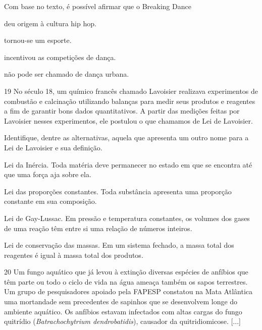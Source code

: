 Com base no texto, é possível afirmar que o Breaking Dance

\begin{escolha}
\item deu origem à cultura hip hop.

\item tornou-se um esporte.

\item incentivou as competições de dança.

\item não pode ser chamado de dança urbana.
\end{escolha}

\pagebreak
\num{19}
  No século 18, um químico francês chamado Lavoisier realizava experimentos de combustão e calcinação utilizando balanças para medir
  seus produtos e reagentes a fim de garantir bons dados quantitativos. A
  partir das medições feitas por Lavoisier nesses experimentos, ele
  postulou o que chamamos de Lei de Lavoisier.


Identifique, dentre as alternativas, aquela que apresenta um outro nome para a Lei de Lavoisier e sua definição.

\begin{escolha}
\item
  Lei da Inércia. Toda matéria deve permanecer no estado em que se
  encontra até que uma força aja sobre ela.
\item
  Lei das proporções constantes. Toda substância apresenta uma proporção
  constante em sua composição.
\item
  Lei de Gay-Lussac. Em pressão e temperatura constantes, os volumes dos
  gases de uma reação têm entre si uma relação de números inteiros.
\item
  Lei de conservação das massas. Em um sistema fechado, a massa total dos
  reagentes é igual à massa total dos produtos.
\end{escolha}

\num{20}
  Um fungo aquático que já levou à extinção diversas espécies de
  anfíbios que têm parte ou todo o ciclo de vida na água ameaça também
  os sapos terrestres. Um grupo de pesquisadores apoiado pela FAPESP
  constatou na Mata Atlântica uma mortandade sem precedentes de sapinhos
  que se desenvolvem longe do ambiente aquático. Os anfíbios estavam
  infectados com altas cargas do fungo quitrídio (\emph{Batrachochytrium
  dendrobatidis}), causador da quitridiomicose. [...]

